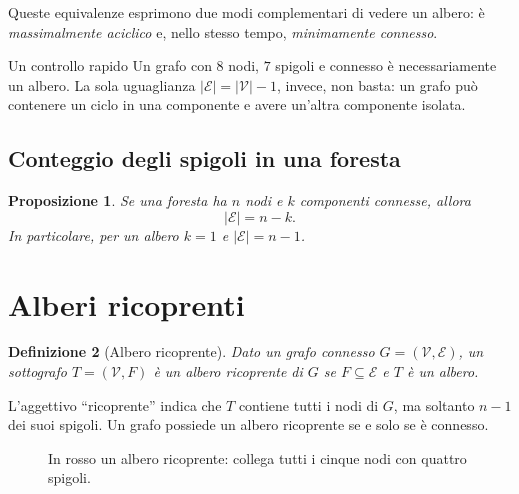 \documentclass[11pt,a4paper]{article}
\newtheorem{definition}{Definizione}[section]
\newtheorem{proposition}[definition]{Proposizione}
\newcommand{\V}{\mathcal{V}}
\newcommand{\E}{\mathcal{E}}
\begin{document}
Queste equivalenze esprimono due modi complementari di vedere un albero: è \emph{massimalmente aciclico} e, nello stesso tempo, \emph{minimamente connesso}.

\begin{examplebox}{Un controllo rapido}
Un grafo con $8$ nodi, $7$ spigoli e connesso è necessariamente un albero. La sola uguaglianza $|\E|=|\V|-1$, invece, non basta: un grafo può contenere un ciclo in una componente e avere un'altra componente isolata.
\end{examplebox}

\subsection{Conteggio degli spigoli in una foresta}

\begin{proposition}
Se una foresta ha $n$ nodi e $k$ componenti connesse, allora
\[
|\E|=n-k.
\]
In particolare, per un albero $k=1$ e $|\E|=n-1$.
\end{proposition}

\section{Alberi ricoprenti}

\begin{definition}[Albero ricoprente]
Dato un grafo connesso $G=(\V,\E)$, un sottografo $T=(\V,F)$ è un \emph{albero ricoprente} di $G$ se $F\subseteq\E$ e $T$ è un albero.
\end{definition}

L'aggettivo ``ricoprente'' indica che $T$ contiene tutti i nodi di $G$, ma soltanto $n-1$ dei suoi spigoli. Un grafo possiede un albero ricoprente se e solo se è connesso.

\begin{figure}[ht]
\centering
{}
\caption{In rosso un albero ricoprente: collega tutti i cinque nodi con quattro spigoli.}
\end{figure}
\end{document}

